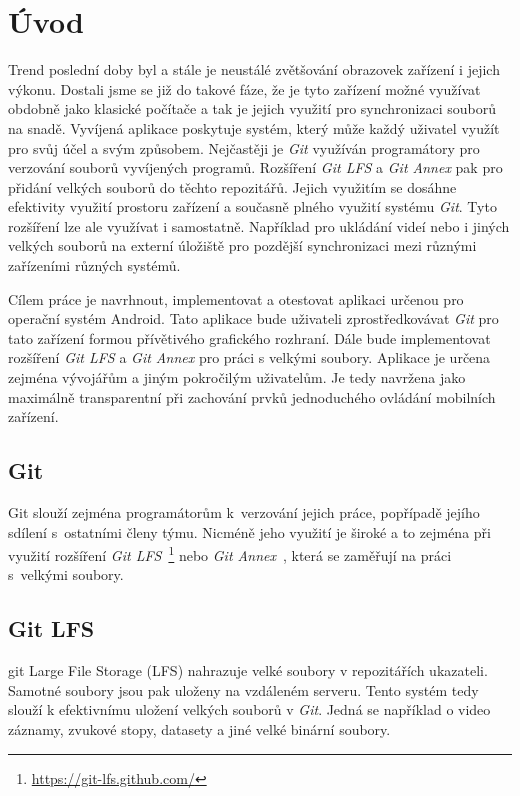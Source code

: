 \chapter{Úvod}
Trend poslední doby byl a stále je neustálé zvětšování obrazovek zařízení i jejich výkonu. Dostali jsme se již do takové fáze, že je tyto zařízení možné využívat obdobně jako klasické počítače a tak je jejich využití pro synchronizaci souborů na snadě.
Vyvíjená aplikace poskytuje systém, který může každý uživatel využít pro svůj účel a svým způsobem. Nejčastěji je \emph{Git} využíván programátory pro verzování souborů vyvíjených programů. Rozšíření \emph{Git LFS} a \emph{Git Annex} pak pro přidání velkých souborů do těchto repozitářů. Jejich využitím se dosáhne efektivity využití prostoru zařízení a současně plného využití systému \emph{Git}. Tyto rozšíření lze ale využívat i samostatně. Například pro ukládání videí nebo i jiných velkých souborů na externí úložiště pro pozdější synchronizaci mezi různými zařízeními různých systémů.

Cílem práce je navrhnout, implementovat a otestovat aplikaci určenou pro operační systém Android. Tato aplikace bude uživateli zprostředkovávat \emph{Git} pro tato zařízení formou přívětivého grafického rozhraní. Dále bude implementovat rozšíření \emph{Git LFS} a \emph{Git Annex} pro práci s velkými soubory. Aplikace je určena zejména vývojářům a jiným pokročilým uživatelům. Je tedy navržena jako maximálně transparentní při zachování prvků jednoduchého ovládání mobilních zařízení.

\newpage
\section{Git}
Git slouží zejména programátorům k verzování jejich práce, popřípadě jejího sdílení s ostatními členy týmu. Nicméně jeho využití je široké a to zejména při využití rozšíření \emph{Git LFS}~\footnote{\label{foot:git-lfs}\url{https://git-lfs.github.com/}} nebo \emph{Git Annex}~, která se zaměřují na práci s velkými soubory.

\section{Git LFS}
git Large File Storage (LFS) nahrazuje velké soubory v repozitářích ukazateli. Samotné soubory jsou pak uloženy na vzdáleném serveru. Tento systém tedy slouží k efektivnímu uložení velkých souborů v \emph{Git}. Jedná se například o video záznamy, zvukové stopy, datasety a jiné velké binární soubory.

